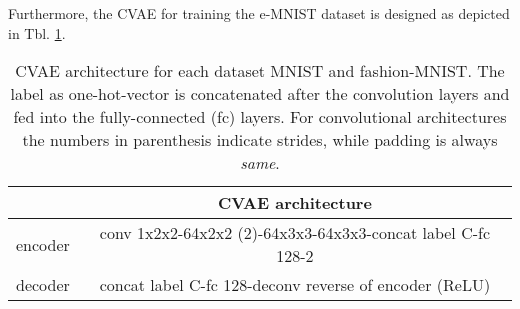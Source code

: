 Furthermore, the CVAE for training the e-MNIST dataset is designed as depicted in Tbl. \ref{tab:architectures_emnist}.

\begin{table}[h]
	\caption{CVAE architecture for each dataset MNIST and fashion-MNIST. The label as one-hot-vector is concatenated after the convolution layers and fed into the fully-connected (fc) layers. For convolutional architectures the numbers in parenthesis indicate strides, while padding is always \textit{same}.}
	\label{tab:architectures_emnist}
	\centering
	\begin{tabular}{lc}
		        & \textbf{CVAE architecture} \\ \hline
		encoder & conv 1x2x2-64x2x2 (2)-64x3x3-64x3x3-concat label C-fc 128-2\\
		decoder & concat label C-fc 128-deconv reverse of encoder (ReLU)
	\end{tabular}
\end{table}

